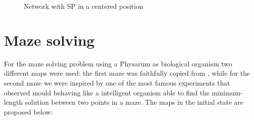 \begin{figure}[H]
    \centering
    \caption{Network with SP in a centered position}
    \label{fig:foobar}
\end{figure}

\section{Maze solving}
\label{maze_solving}

For the maze solving problem using a Physarum as biological organism two different maps were used: the first maze was faithfully copied from \cite{dourvas2016gpgpu}, while for the second maze we were inspired by one of the most famous experiments \cite{nakagaki2000intelligence} that observed mould behaving like a intelligent organism able to find the minimum-length solution between two points in a maze. The maps in the initial state are proposed below:

